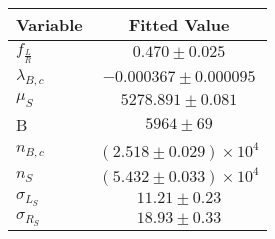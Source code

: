 \begin{tabular}[t]{lc}
\hline
Variable &Fitted Value\\
\hline\hline
$f_{\frac{L}{R}}$&$0.470\pm0.025$\\
\hline
$\lambda_{B,c}$&$-0.000367\pm0.000095$\\
\hline
$\mu_S$&$5278.891\pm0.081$\\
\hline
B&$5964\pm69$\\
\hline
$n_{B,c}$&$(2.518\pm0.029)\times 10^4$\\
\hline
$n_S$&$(5.432\pm0.033)\times 10^4$\\
\hline
$\sigma_{L_S}$&$11.21\pm0.23$\\
\hline
$\sigma_{R_S}$&$18.93\pm0.33$\\
\hline
\end{tabular}